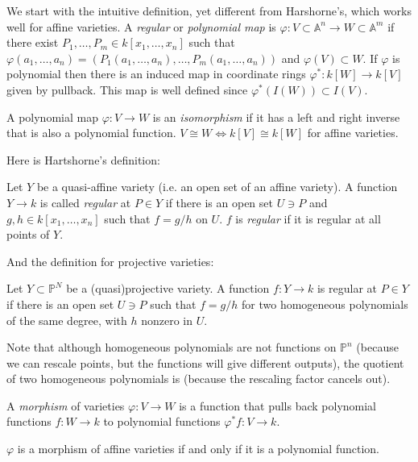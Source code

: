 \noindent
We start with the intuitive definition, yet
different from Harshorne's,
which works well for affine varieties.
A {\it regular} or {\it polynomial map}
is $\varphi:V \subset \mathbb{A}^n \to W
\subset \mathbb{A}^m$
if there exist $P_1,…,P_m \in k[x_1,…,x_n]$
such that
$\varphi(a_1,…,a_n)=(P_1(a_1,…,a_n),…,
P_m(a_1,…,a_n))$
and $\varphi(V) \subset W$.
If $\varphi$ is polynomial then there is an
induced
map in coordinate rings
$\varphi^*:k[W] \to k[V]$ given by pullback.
This map is well defined since
$\varphi^*(I(W))\subset I(V)$.

A polynomial map $\varphi:V \to W$ is an {\it
isomorphism}
if it has a left and right inverse that is
also a polynomial function.
$V \cong W \iff k[V] \cong k[W]$ for affine
varieties.

\medskip\noindent
Here is Hartshorne's definition:

\begin{definition}
\label{definition-regular-function}
Let $Y$ be a quasi-affine variety
(i.e. an open set of an affine variety).
A function $Y \to k$ is called {\it regular}
at $P \in Y$
if there is an open set $U \ni P$ and
$g,h \in k[x_1,…,x_n]$ such that
$f=g/h$ on $U$. $f$ is {\it regular} if it is
regular
at all points of $Y$.
\end{definition}

\noindent
And the definition for projective varieties:

\begin{definition}
\label{definition-regul-funct-proje}
Let $Y \subset \mathbb{P}^N$ be a
(quasi)projective variety.
A function $f:Y \to k$ is regular at $P \in
Y$
if there is an open set $U \ni P$ such that
$f=g/h$ for two homogeneous polynomials of
the same degree,
with $h$ nonzero in $U$.
\end{definition}

\noindent
Note that although homogeneous polynomials
are not functions on $\mathbb{P}^n$
(because we can rescale points, but the
functions will give different outputs),
the quotient of two homogeneous polynomials
is (because the rescaling factor
cancels out).

\begin{definition}
\label{definition-morphism}
A {\it morphism} of varieties $\varphi:V \to
W$
is a function that pulls back polynomial
functions
$f:W \to k$ to polynomial functions
$\varphi^*f:V \to k$.
\end{definition}

\begin{exercise}
\label{exercise-morphisms-def}
$\varphi$ is a morphism of affine varieties
if and only if
it is a polynomial function.
\end{exercise}

